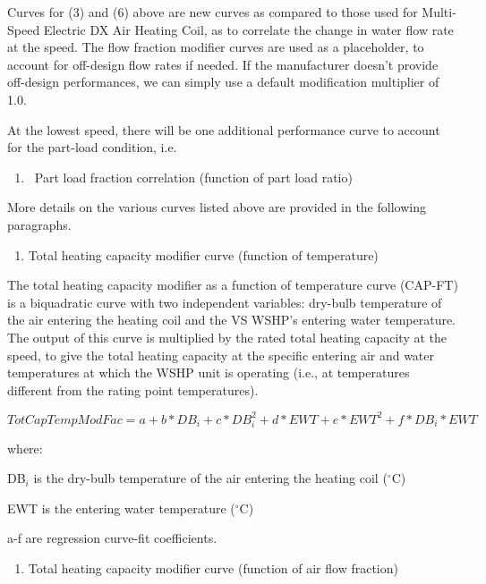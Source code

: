 Curves for (3) and (6) above are new curves as compared to those used for Multi-Speed Electric DX Air Heating Coil, as to correlate the change in water flow rate at the speed. The flow fraction modifier curves are used as a placeholder, to account for off-design flow rates if needed. If the manufacturer doesn't provide off-design performances, we can simply use a default modification multiplier of 1.0.

At the lowest speed, there will be one additional performance curve to account for the part-load condition, i.e.

\begin{enumerate}
\def\labelenumi{\arabic{enumi})}
\setcounter{enumi}{7}
\item
  ~Part load fraction correlation (function of part load ratio)
\end{enumerate}

More details on the various curves listed above are provided in the following paragraphs.

\begin{enumerate}
\def\labelenumi{\arabic{enumi})}
\item Total heating capacity modifier curve (function of temperature)
\end{enumerate}

The total heating capacity modifier as a function of temperature curve (CAP-FT) is a biquadratic curve with two independent variables: dry-bulb temperature of the air entering the heating coil and the VS WSHP's entering water temperature. The output of this curve is multiplied by the rated total heating capacity at the speed, to give the total heating capacity at the specific entering air and water temperatures at which the WSHP unit is operating (i.e., at temperatures different from the rating point temperatures).

\begin{equation}
TotCapTempModFac = a + b*D{B_i} + c*DB_i^2 + d*EWT + e*EW{T^2} + f*D{B_i}*EWT
\end{equation}

where:

DB\(_{i}\) is the dry-bulb temperature of the air entering the heating coil (\(^{\circ}\)C)

EWT is the entering water temperature (\(^{\circ}\)C)

a-f are regression curve-fit coefficients.

\begin{enumerate}
\def\labelenumi{\arabic{enumi})}
\setcounter{enumi}{1}
\tightlist
\item
  Total heating capacity modifier curve (function of air flow fraction)
\end{enumerate}

